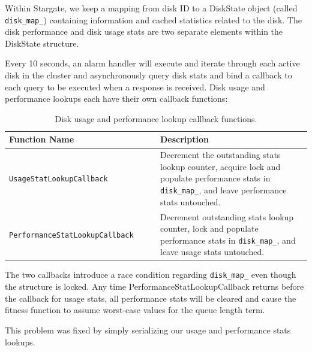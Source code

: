 \documentclass[12pt]{article}
\begin{document}
\begin{appendices}
  Within Stargate, we keep a mapping from disk ID to a DiskState object (called
  \texttt{disk\_map\_}) containing information and cached statistics related to the
  disk. The disk performance and disk usage stats are two separate elements
  within the DiskState structure.

  Every 10 seconds, an alarm handler will execute and iterate through each
  active disk in the cluster and asynchronously query disk stats and bind a
  callback to each query to be executed when a response is received. Disk usage
  and performance lookups each have their own callback functions:

  \begin{table}[htbp]
    \caption{Disk usage and performance lookup callback functions.}
    \begin{center}
    \begin{tabular}{ | p{0.5\linewidth} | p{0.5\linewidth} | }
      \hline
      \textbf{Function Name} & \textbf{Description} \\ \hline
      \verb|UsageStatLookupCallback| & Decrement the outstanding stats lookup
                                       counter, acquire lock and populate
                                       performance stats in
                                       \texttt{disk\_map\_}, and leave
                                       performance stats untouched.
                                       \\ \hline

      \verb|PerformanceStatLookupCallback| & Decrement outstanding stats
                                             lookup counter, lock and
                                             populate performance stats in
                                             \texttt{disk\_map\_}, and leave
                                             usage stats untouched. \\ \hline

      \hline
    \end{tabular}
    \end{center}
  \end{table}

  The two callbacks introduce a race condition regarding \texttt{disk\_map\_}
  even though the structure is locked. Any time PerformanceStatLookupCallback
  returns before the callback for usage stats, all performance stats will be
  cleared and cause the fitness function to assume worst-case values for the
  queue length term.

  This problem was fixed by simply serializing our usage and performance stats
  lookups.
\end{appendices}
\end{document}
